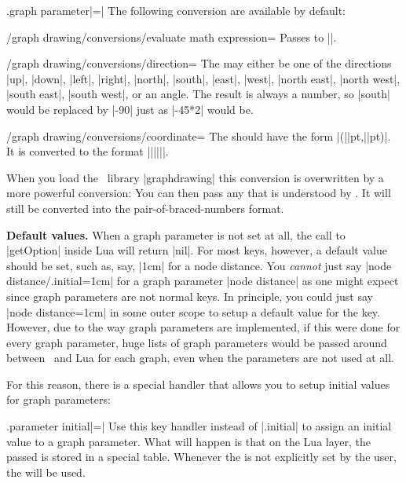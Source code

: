 \begin{handler}{{.graph parameter}|=|}
  The following conversion are available by default:
  \begin{key}{/graph drawing/conversions/evaluate math
      expression=}
    Passes  to |\pgfmathparse|.    
  \end{key}
  \begin{key}{/graph drawing/conversions/direction=}
    The  may either be one of the directions |up|,
    |down|, |left|, |right|, |north|, |south|, |east|, |west|,
    |north east|, |north west|, |south east|, |south west|, or an
    angle. The result is always a number, so |south| would be replaced
    by |-90| just as |-45*2| would be.
  \end{key}
  \begin{key}{/graph drawing/conversions/coordinate=}
    The  should have the form
    |(||pt,||pt)|. It is converted to the
    format |{||}{||}|.

    When you load the \tikzname\ library |graphdrawing| this
    conversion is overwritten by a more powerful conversion: You can
    then pass any  that is understood by
    \tikzname. It will still be converted into the
    pair-of-braced-numbers format.
  \end{key}
  
  \medskip
  \noindent\textbf{Default values.}
  When a graph parameter is not set at all, the call to |getOption|
  inside Lua will return |nil|. For most keys, however, a default
  value should be set, such as, say, |1cm| for a node distance. You
  \emph{cannot} just say |node distance/.initial=1cm| for a graph
  parameter |node distance| as one might expect since graph parameters
  are not normal keys. In principle, you could just say
  |node distance=1cm| in some outer scope to setup a default value for the
  key. However, due to the way graph parameters are implemented, if
  this were done for every graph parameter, huge lists of graph
  parameters would be passed around between \pgfname\ and Lua for each
  graph, even when the parameters are not used at all.

  For this reason, there is a special handler that allows you to setup
  initial values for graph parameters:
  \begin{handler}{{.parameter initial}|=|}
    Use this key handler instead of |.initial| to assign an initial value
    to a graph parameter. What will happen is that on the Lua layer,
    the passed  is stored in a special table. Whenever the
     is not explicitly set by the user, the 
    will be used.


\end{handler}
\end{handler}
